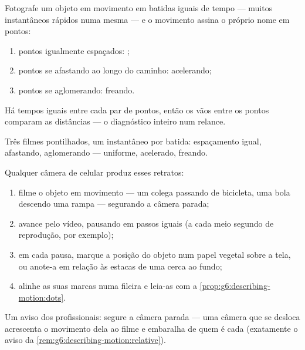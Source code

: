 \begin{proposition}\label{prop:g6:describing-motion:dots}
Fotografe um objeto em movimento em batidas iguais de tempo ---
muitos instantâneos rápidos numa mesma  --- e o movimento
assina o próprio nome em pontos:
\begin{enumerate}
  \item pontos igualmente espaçados: ;
  \item pontos se afastando ao longo do caminho: acelerando;
  \item pontos se aglomerando: freando.
\end{enumerate}
Há tempos iguais entre cada par de pontos, então os vãos entre os
pontos comparam as distâncias --- o diagnóstico inteiro num relance.
\end{proposition}

\begin{omfigure}

{\small Três filmes pontilhados, um instantâneo por batida:
espaçamento igual, afastando, aglomerando --- uniforme, acelerado,
freando.}
\end{omfigure}

\begin{method}\label{met:g6:describing-motion:film}
Qualquer câmera de celular produz esses retratos:
\begin{enumerate}
  \item filme o objeto em movimento --- um colega passando de
        bicicleta, uma bola descendo uma rampa --- segurando a câmera
        parada;
  \item avance pelo vídeo, pausando em passos iguais (a cada meio
        segundo de reprodução, por exemplo);
  \item em cada pausa, marque a posição do objeto num papel vegetal
        sobre a tela, ou anote-a em relação às estacas de uma cerca
        ao fundo;
  \item alinhe as suas marcas numa fileira e leia-as com a
        \cref{prop:g6:describing-motion:dots}.
\end{enumerate}
Um aviso dos profissionais: segure a câmera parada --- uma câmera que
se desloca acrescenta o movimento dela ao filme e embaralha de quem é
cada  (exatamente o aviso da
\cref{rem:g6:describing-motion:relative}).
\end{method}

